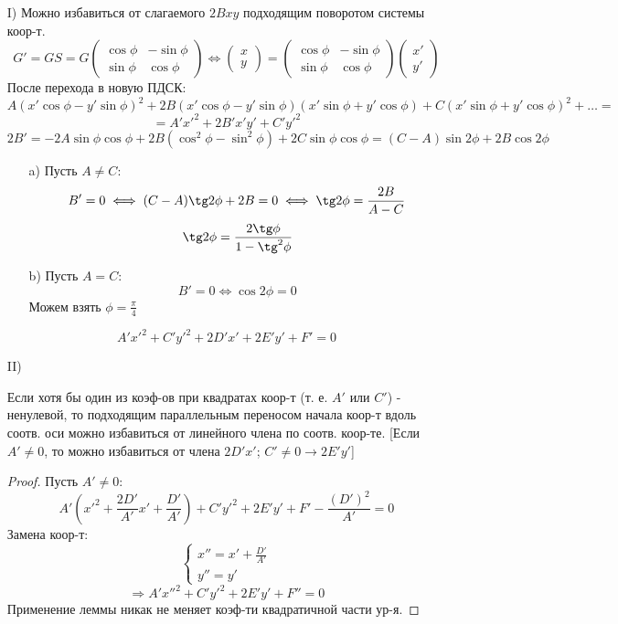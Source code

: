 \begin{itemize}
  \item [I)] Можно избавиться от слагаемого $2Bxy$ подходящим поворотом системы коор-т.
    \[
      G' = GS = G \begin{pmatrix}\cos \phi & -\sin\phi \\ \sin\phi & \cos\phi \end{pmatrix} \iff \begin{pmatrix}x \\ y \end{pmatrix} = \begin{pmatrix}\cos\phi & -\sin\phi \\ \sin\phi & \cos\phi\end{pmatrix}\begin{pmatrix}x' \\ y' \end{pmatrix}
    \]
    После перехода в новую ПДСК:
    \[
    A(x'\cos\phi - y'\sin\phi)^{2} + 2B(x'\cos\phi - y'\sin\phi)(x'\sin\phi + y'\cos\phi) + C(x'\sin\phi + y'\cos\phi)^{2} + \ldots = 
    \]
    \[
  = A'x'^{2} + 2B'x'y' + C'y'^{2}
    \]
    \[
    2B' = -2A\sin\phi\cos\phi + 2B(\cos^{2}\phi - \sin^{2}\phi) + 2C\sin\phi\cos\phi = (C - A)\sin 2\phi + 2B\cos 2\phi
    \]
    \begin{itemize}
      \item [a)] Пусть $A \neq C$:
        \[
        B' = 0 \iff (C - A)\tg 2\phi + 2B = 0 \iff \tg 2\phi = \frac{2B}{A - C}
        \]
        \[
        \tg 2\phi = \frac{2\tg \phi}{1 - \tg^{2}\phi}
        \]
      \item [b) ] Пусть $A = C$:
        \[
        B' = 0 \iff \cos 2\phi = 0
        \]
        Можем взять $\phi = \frac{\pi}{4}$
    \end{itemize}
  \begin{equation}
  A'x'^{2} + C'y'^{2} + 2D'x' + 2E'y' + F' = 0
  \end{equation}
\item [II)]
  \begin{lemma}
    Если хотя бы один из коэф-ов при квадратах коор-т (т. е. $A'$ или $C'$) - ненулевой, то подходящим параллельным переносом начала коор-т вдоль соотв. оси можно избавиться от линейного члена по соотв. коор-те. [Если $A' \neq 0$, то можно избавиться от члена $2D'x'$; $C' \neq 0 \rightarrow 2E'y'$]
  \end{lemma}
  \begin{proof}
  Пусть $A' \neq 0$:
  \[
  A'(x'^{2} + \frac{2D'}{A'}x' + \frac{D'}{A'}) + C'y'^{2} + 2E'y' + F' - \frac{(D')^{2}}{A'} = 0
  \]
  Замена коор-т:
  \[
  \begin{cases}
  x'' = x' + \frac{D'}{A'} \\
  y'' = y'
  \end{cases}
  \]
  \[
  \Rightarrow A'x''^{2} + C'y'^{2} + 2E'y' + F'' = 0
  \]
  Применение леммы никак не меняет коэф-ти квадратичной части ур-я.
  \end{proof}
\end{itemize}

